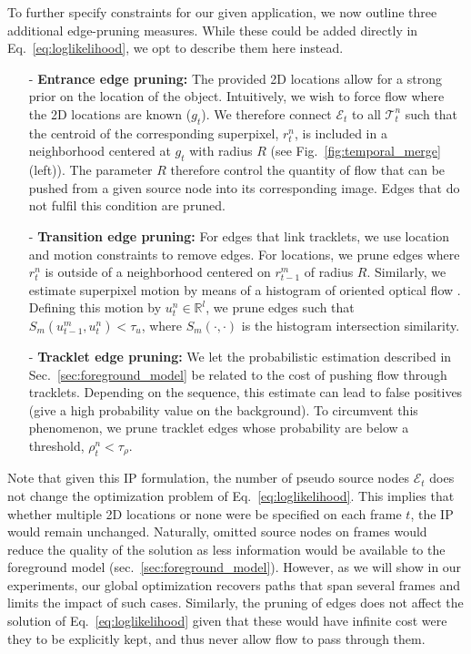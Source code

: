 To further specify constraints for our given application, we now outline three additional edge-pruning measures. While these could be added directly in Eq.~\eqref{eq:loglikelihood}, we opt to describe them here instead.
\begin{itemize}
\item[-] {\bf Entrance edge pruning:} The provided 2D locations allow for a strong prior on the location of the object. Intuitively, we wish to force flow where the 2D locations are known (\ie $g_t$). We therefore connect $\mathcal{E}_t$ to all $\mathcal{T}_t^n$ such that the centroid of the corresponding superpixel, $r_t^n$, is included in a neighborhood centered at $g_t$ with radius $R$ (see Fig.~\ref{fig:temporal_merge}(left)). %
The parameter $R$ therefore control the quantity of flow that can be pushed from a given source node into its corresponding image. Edges that do not fulfil this condition are pruned.

\item[-] {\bf Transition edge pruning:} For edges that link tracklets, we use location and motion constraints to remove edges. For locations, we prune edges where $r_{t}^n$ is outside of a neighborhood centered on $r_{t-1}^m$ of radius $R$. Similarly, we estimate  superpixel motion by means of a histogram of oriented optical flow \cite{chaudhry09}. Defining this motion by $u_t^n\in \mathbb{R}^l$, we prune edges such that $S_m(u_{t-1}^m,u_t^n) < \tau_u$, where $S_m(\cdot,\cdot)$ is the histogram intersection similarity.

\item[-] {\bf Tracklet edge pruning:} We let the probabilistic estimation described in Sec.~\ref{sec:foreground_model} be related to the cost of pushing flow through tracklets. Depending on the sequence, this estimate can lead to false positives (\ie give a high probability value on the background). To circumvent this phenomenon, we prune tracklet edges whose probability are below a threshold, $\rho_t^n < \tau_\rho$.
\end{itemize}

Note that given this IP formulation, the number of pseudo source nodes $\mathcal{E}_t$ does not change the optimization problem of Eq.~\eqref{eq:loglikelihood}. This implies that whether multiple 2D locations or none were be specified on each frame $t$, the IP would remain unchanged. Naturally, omitted source nodes on frames would reduce the quality of the solution as less information would be available to the foreground model (sec.~\ref{sec:foreground_model}). However, as we will show in our experiments, our global optimization recovers paths that span several frames and limits the impact of such cases. Similarly, the pruning of edges does not affect the solution of Eq.~\eqref{eq:loglikelihood} given that these would have infinite cost were they to be explicitly kept, and thus never allow flow to pass through them. 

